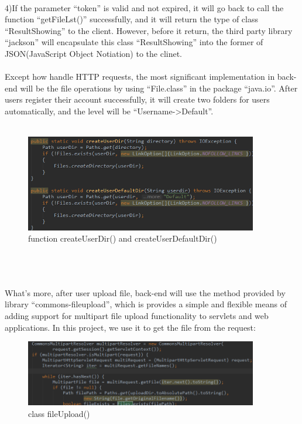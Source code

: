 \documentclass[12pt,a4]{article}
\begin{document}
\\
\\
\\
\\
\\
\\
\\
\\
\\
\\
\\
4)If the parameter “token” is valid and not expired, it will go back to call the function “getFileLst()” successfully, and it will return the type of class “ResultShowing” to the client. However, before it return, the third party library “jackson” will encapsulate this class “ResultShowing” into the former of JSON(JavaScript Object Notiation) to the clinet.	
\\
\\
Except how handle HTTP requests, the most significant implementation in back-end will be the file operations by using “File.class” in the package “java.io”. After users register their account successfully, it will create two folders for users automatically, and the level will be “Username->Default”.\\\\ 
\begin{figure}[h]%
		\centering  %
		\includegraphics[width=4in]{figure/except1}  	%
		\caption{function createUserDir() and createUserDefaultDir()}   %
		\end{figure}
\\
\\
\\
What’s more, after user upload file, back-end will use the method provided by library “commons-fileupload”, which is provides a simple and flexible means of adding support for multipart file upload functionality to servlets and web applications. In this project, we use it to get the file from the request:\\
\begin{figure}[h]%
		\centering  %
		\includegraphics[width=4in]{figure/except2}  	%
		\caption{class fileUpload()}   %
		\end{figure}\\
\end{document}
